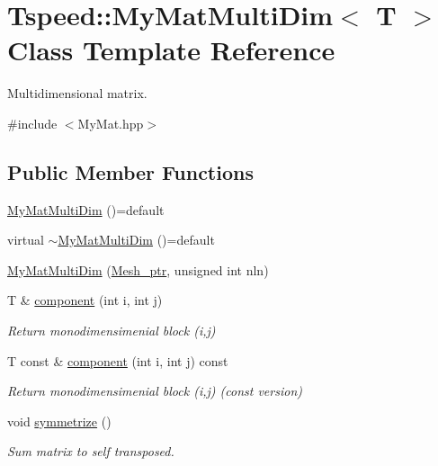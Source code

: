 \hypertarget{classTspeed_1_1MyMatMultiDim}{\section{Tspeed\-:\-:My\-Mat\-Multi\-Dim$<$ T $>$ Class Template Reference}
\label{classTspeed_1_1MyMatMultiDim}
}


Multidimensional matrix.  




{\ttfamily \#include $<$My\-Mat.\-hpp$>$}

\subsection*{Public Member Functions}
\begin{DoxyCompactItemize}
\item 
\hyperlink{classTspeed_1_1MyMatMultiDim_a1d08f2d14a8074dbfc0fb0ccf85c5bd3}{My\-Mat\-Multi\-Dim} ()=default
\item 
virtual \hyperlink{classTspeed_1_1MyMatMultiDim_a1186b247ce40afb915e3fac80f99deb3}{$\sim$\-My\-Mat\-Multi\-Dim} ()=default
\item 
\hyperlink{classTspeed_1_1MyMatMultiDim_aae1c5f412040fbc3f344f612b4609f95}{My\-Mat\-Multi\-Dim} (\hyperlink{namespaceTspeed_a7367a01365c4cc2c1a09305b3effc4e8}{Mesh\-\_\-ptr}, unsigned int nln)
\item 
T \& \hyperlink{classTspeed_1_1MyMatMultiDim_a03782558106363767dd160f5170e6a66}{component} (int i, int j)
\begin{DoxyCompactList}\small\item\em Return monodimensimenial block (i,j) \end{DoxyCompactList}\item 
T const \& \hyperlink{classTspeed_1_1MyMatMultiDim_a4d217bb29f278fb65a8f02df72bf7142}{component} (int i, int j) const 
\begin{DoxyCompactList}\small\item\em Return monodimensimenial block (i,j) (const version) \end{DoxyCompactList}\item 
void \hyperlink{classTspeed_1_1MyMatMultiDim_a9e0b39723d52237575763129f4056349}{symmetrize} ()
\begin{DoxyCompactList}\small\item\em Sum matrix to self transposed. \end{DoxyCompactList}\item 

\end{DoxyCompactItemize}
